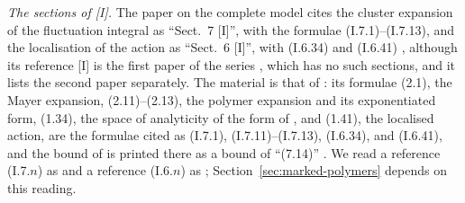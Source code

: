\documentclass[11pt]{preprint}
\numberwithin{equation}{section}
\theoremstyle{definition}
\theoremstyle{remark}
\theoremstyle{plain}
\begin{document}
\emph{The sections of [I].} The paper on the complete model cites the cluster expansion of the fluctuation integral as ``Sect.~7 [I]'', with the formulae (I.7.1)--(I.7.13), and the localisation of the action as ``Sect.~6 [I]'', with (I.6.34) and (I.6.41) \cite[pp.~275--278]{BalabanCRE}, although its reference [I] is the first paper of the series \cite{BalabanRG1}, which has no such sections, and it lists the second paper \cite{BalabanRG2} separately. The material is that of \cite{BalabanRG2}: its formulae (2.1), the Mayer expansion, (2.11)--(2.13), the polymer expansion and its exponentiated form, (1.34), the space of analyticity of the form of \cite[(3.43), p.~276]{BalabanCRE}, and (1.41), the localised action, are the formulae cited as (I.7.1), (I.7.11)--(I.7.13), (I.6.34), and (I.6.41), and the bound of \cite[(2.14)]{BalabanRG2} is printed there as a bound of ``(7.14)'' \cite[p.~15]{BalabanRG2}. We read a reference (I.7.$n$) as \cite[(2.$n$)]{BalabanRG2} and a reference (I.6.$n$) as \cite[(1.$n$)]{BalabanRG2}; Section~\ref{sec:marked-polymers} depends on this reading.
\end{document}
